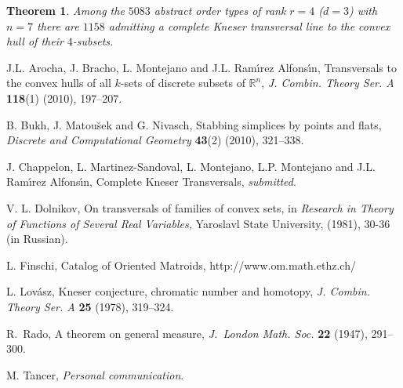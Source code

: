 \documentclass[11pt]{amsart}
\theoremstyle{plain}
\newtheorem{theorem}{Theorem}[section]
\theoremstyle{definition}
\theoremstyle{remark}
\begin{document}
\begin{theorem}
Among the $5083$ abstract order types of rank $r=4$ ($d=3$) with $n=7$ there are $1158$ admitting a complete Kneser transversal line to the convex hull of their $4$-subsets.
\end{theorem} 

\begin{thebibliography}{}

 J.L. Arocha, J. Bracho, L. Montejano and J.L. Ram\'{\i}rez Alfons\'{\i}n, Transversals to the convex hulls of all $k$-sets of discrete subsets of $\mathbb{R}^{n}$, \emph{J. Combin. Theory Ser. A} \textbf{118}{}(1) (2010), 197--207.

 B. Bukh, J. Matou\u sek and G. Nivasch,  Stabbing simplices by points and flats, \emph{Discrete and Computational Geometry} \textbf{43}{}(2) (2010), 321--338.

 J. Chappelon, L. Martinez-Sandoval, L. Montejano, L.P. Montejano and J.L. Ram\'{\i}rez Alfons\'{\i}n,  Complete Kneser Transversals, \emph{submitted}.

 V. L. Dolnikov, On transversals of families of convex sets,  in \emph{Research in Theory of Functions of Several Real Variables,}  Yaroslavl State University, (1981), 30-36 (in Russian).

 L. Finschi, Catalog of Oriented Matroids, http://www.om.math.ethz.ch/ 

 L. Lov\'asz, Kneser conjecture, chromatic number and homotopy, \emph{J. Combin. Theory Ser. A} \textbf{25} (1978), 319--324.

 R.~Rado, A theorem on general measure, \emph{J.\ London Math. Soc.} \textbf{22} (1947), 291--300.

 M. Tancer,  \emph{Personal communication}.

\end{thebibliography}
\end{document}
